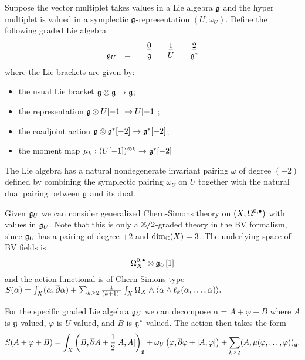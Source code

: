 \documentclass[10pt, oneside]{article}
\begin{document}
Suppose the vector multiplet takes values in a Lie algebra $\mathfrak g$ and the hyper multiplet is valued in a symplectic $\mathfrak g$-representation $(U,\omega_U)$. 
Define the following graded Lie algebra
\[
\begin{array}{ccccccccc}
&&& \underline{0}  & & \underline{1} & & \underline{2} \\
\mathfrak g_U & = && \mathfrak g & & U & & \mathfrak g^*
\end{array}
\]
where the Lie brackets are given by:
\begin{itemize}
\item the usual Lie bracket $\mathfrak g \otimes \mathfrak g \to \mathfrak g$;
\item the representation $\mathfrak g \otimes U[-1] \to U[-1]$;
\item the coadjoint action $\mathfrak g \otimes \mathfrak g^*[-2] \to \mathfrak g^*[-2]$;
\item the moment map $\mu_k : (U[-1])^{\otimes k} \to \mathfrak g^*[-2]$ 
\end{itemize}

The Lie algebra has a natural nondegenerate invariant pairing $\omega$ of degree $(+2)$ defined by combining the symplectic pairing $\omega_U$ on $U$ together with the natural dual pairing between $\mathfrak g$ and its dual. 

Given $\mathfrak g_U$ we can consider generalized Chern-Simons theory on $(X, \Omega^{0,\bullet})$ with values in $\mathfrak g_U$.
Note that this is only a $\mathbb Z/2$-graded theory in the BV formalism, since $\mathfrak g_U$ has a pairing of degree $+2$ and $\dim_\mathbb C (X) = 3$. 
The underlying space of BV fields is 
\[
\Omega^{0,\bullet}_X \otimes \mathfrak g_U [1]
\]
and the action functional is of Chern-Simons type $S(\alpha) = \int_X (\alpha, \overline{\partial} \alpha) + \sum_{k\geq 2}\frac{1}{(k+1)!} \int_{X} \Omega_X\wedge \langle \alpha \wedge \ell_k(\alpha, \dots, \alpha)\rangle.$

For the specific graded Lie algebra $\mathfrak g_U$ we can decompose $\alpha = A + \varphi + B$ where $A$ is $\mathfrak g$-valued, $\varphi$ is $U$-valued, and $B$ is $\mathfrak g^*$-valued.
The action then takes the form
\[
S(A + \varphi + B) = \int_X \left(B, \overline{\partial} A + \frac{1}{2} [A,A] \right)_\mathfrak g + \omega_U \left(\varphi, \overline{\partial} \varphi + [A, \varphi] \right) + \sum_{k\geq 2} (A, \mu(\varphi, \ldots, \varphi))_\mathfrak g .
\]
\end{document}
